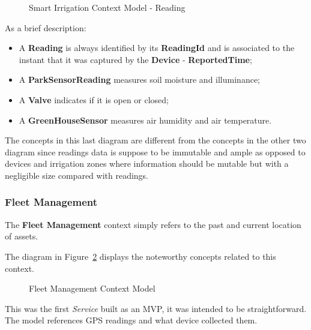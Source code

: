 \begin{figure}[H]
   \centering
  \resizebox{\columnwidth}{!}
  {
     
  }
  \caption[Smart Irrigation Context Model - Reading]{Smart Irrigation Context Model - Reading}
  \label{fig:design:domain:bounded_contexts:irrigation:diagram:reading}
\end{figure}

As a brief description:

\begin{itemize}
   \item A \textbf{Reading} is always identified by its \textbf{ReadingId} and is associated to the instant that it was captured by the \textbf{Device} - \textbf{ReportedTime};
   \item A \textbf{ParkSensorReading} measures soil moisture and illuminance;
   \item A \textbf{Valve} indicates if it is open or closed;
   \item A \textbf{GreenHouseSensor} measures air humidity and air temperature.
\end{itemize}

The concepts in this last diagram are different from the concepts in the other two diagram since readings data is suppose to be immutable and ample as opposed to devices and irrigation zones where information should be mutable but with a negligible size compared with readings.

\subsubsection{Fleet Management}
\label{subsubsec:design:domain:bounded_contexts:fleet}

The \textbf{Fleet Management} context simply refers to the past and current location of assets. 

The diagram in Figure~\ref{fig:design:domain:bounded_contexts:fleet:diagram} displays the noteworthy concepts related to this context.

\begin{figure}[H]
   \centering
  \resizebox{\columnwidth}{!}
  {
     
  }
  \caption[Fleet Management Context Model]{Fleet Management Context Model}
  \label{fig:design:domain:bounded_contexts:fleet:diagram}
\end{figure}

This was the first \textit{Service} built as an \gls{MVP}, it was intended to be straightforward. The model references \gls{GPS} readings and what device collected them.

